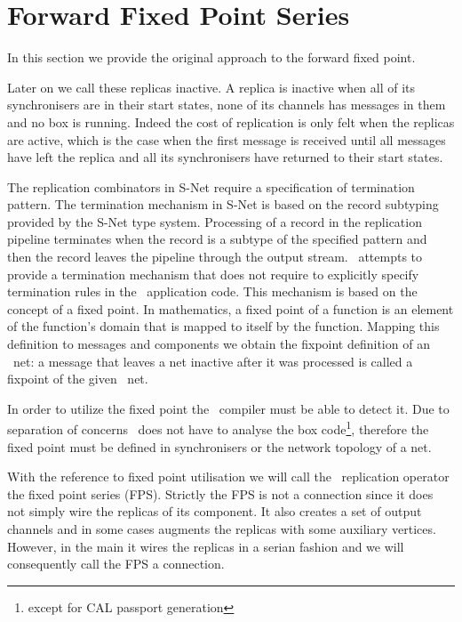     \section{Forward Fixed Point Series\label{ffp}}
In this section we provide the original approach to the forward fixed point.


Later on we call these replicas inactive. A replica is inactive when all of its synchronisers are in their start states, none of its channels has messages in them and no box is running. Indeed the cost of replication is only felt when the replicas are active, which is the case when the first message is received until all messages have left the replica and all its synchronisers have returned to their start states.


The replication combinators in S-Net require a specification of termination pattern. The termination mechanism in S-Net is based on the record subtyping provided by the S-Net type system. Processing of a record in the replication pipeline terminates when the record is a subtype of the specified pattern and then the record leaves the pipeline through the output stream. \ak\ attempts to provide a termination mechanism that does not require to explicitly specify termination rules in the \ak\ application code. This mechanism is based on the concept of a fixed point. In mathematics, a fixed point of a function is an element of the function's domain that is mapped to itself by the function. Mapping this definition to messages and components we obtain the fixpoint definition of an \ak\ net: a message that leaves a net inactive after it was processed is called a fixpoint of the given \ak\ net.

In order to utilize the fixed point the \ak\ compiler must be able to detect it. Due to separation of concerns \ak\ does not have to analyse the box code\footnote{except for CAL passport generation}, therefore the fixed point must be defined in synchronisers or the network topology of a net. %

With the reference to fixed point utilisation we will call the \ak\ replication operator the fixed point series (FPS). Strictly the FPS is not a connection since it does not simply wire the replicas of its component. It also creates a set of output channels and in some cases augments the replicas with some auxiliary vertices. However, in the main it wires the replicas in a serian fashion and we will consequently call the FPS a connection.



